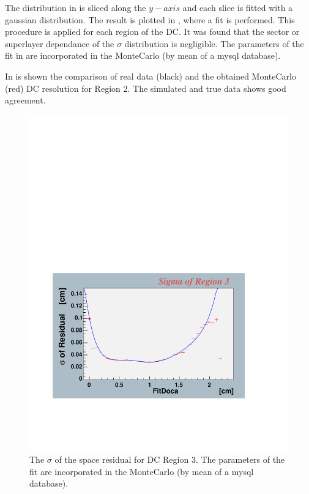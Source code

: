 The distribution in  is sliced along the $y-axis$ and each slice is fitted with 
a gaussian distribution. The result is plotted in , where a fit is performed.
This procedure is applied for each region of the DC. It was found that the sector or superlayer
dependance of the $\sigma$ distribution is negligible. 
The parameters of the fit in  are incorporated in the MonteCarlo (by mean of a mysql database).

\cia
In  is shown the comparison of real data (black) and 
the obtained MonteCarlo (red) DC resolution for Region 2. The simulated and true 
data shows good agreement.

\begin{figure}[h]
 \begin{center}
 \includegraphics[width = 12cm, bb=0 100 620 450]{acceptance/img/res3} 
  \caption[The $\sigma$ of the space residual for DC Region 3]
          { The $\sigma$ of the space residual for DC Region 3. The parameters of the fit are
	             incorporated in the MonteCarlo (by mean of a mysql database).}
 \label{fig:dc_sigma}
 \end{center}
\end{figure}




